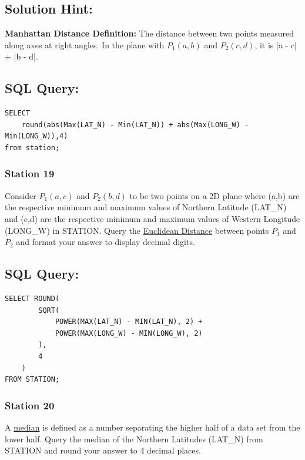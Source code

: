 \documentclass[12pt,a4paper]{article}
\begin{document}
\subsection*{Solution Hint: }
\textbf{Manhattan Distance Definition:} The distance between two points measured along axes at right angles. In the plane with $P_1(a,b)$ and $P_2(c,d)$, it is |a - c| + |b - d|.
\subsection*{SQL Query: }
\begin{lstlisting}[style=sqlstyle]
SELECT
    round(abs(Max(LAT_N) - Min(LAT_N)) + abs(Max(LONG_W) - Min(LONG_W)),4)
from station;
\end{lstlisting}
\subsubsection{Station 19}
Consider $P_1(a,c)$ and $P_2(b,d)$ to be two points on a 2D plane where (a,b) are the respective minimum and maximum values of Northern Latitude (LAT\_N) and (c,d) are the respective minimum and maximum values of Western Longitude (LONG\_W) in STATION.\newline
Query the \href{https://en.wikipedia.org/wiki/Euclidean_distance}{Euclidean Distance} between points $P_1$ and $P_2$ and format your answer to display  decimal digits.
\subsection*{SQL Query: }
\begin{lstlisting}[style=sqlstyle]
SELECT ROUND(
        SQRT(
            POWER(MAX(LAT_N) - MIN(LAT_N), 2) +
            POWER(MAX(LONG_W) - MIN(LONG_W), 2)
        ),
        4
    )
FROM STATION;
\end{lstlisting}
\subsubsection{Station 20}
A \href{https://en.wikipedia.org/wiki/Median}{median} is defined as a number separating the higher half of a data set from the lower half. Query the median of the Northern Latitudes (LAT\_N) from STATION and round your answer to 4 decimal places.
\end{document}
